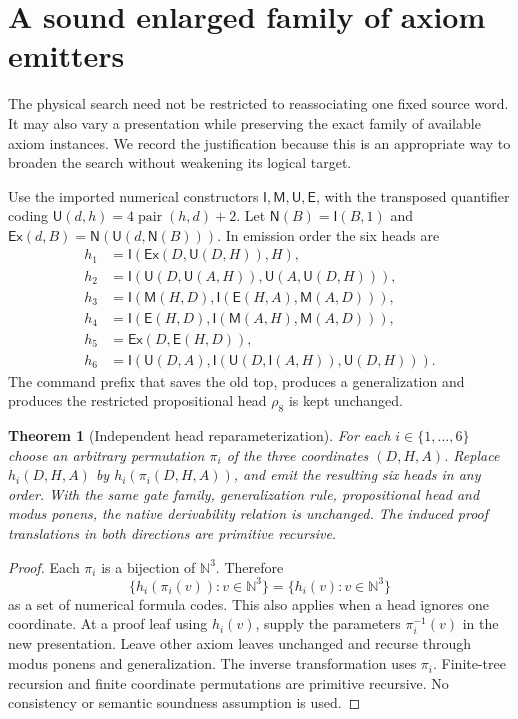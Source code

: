 \documentclass[10pt,letterpaper]{article}
\newtheorem{theorem}{Theorem}
\newcommand{\I}{\mathsf I}
\newcommand{\M}{\mathsf M}
\newcommand{\U}{\mathsf U}
\newcommand{\E}{\mathsf E}
\newcommand{\N}{\mathsf N}
\newcommand{\Ex}{\mathsf{Ex}}
\begin{document}
\section{A sound enlarged family of axiom emitters}

The physical search need not be restricted to reassociating one fixed source
word. It may also vary a presentation while preserving the exact family of
available axiom instances. We record the justification because this is an
appropriate way to broaden the search without weakening its logical target.

Use the imported numerical constructors $\I,\M,\U,\E$, with the transposed
quantifier coding $\U(d,h)=4\operatorname{pair}(h,d)+2$. Let
$\N(B)=\I(B,1)$ and $\Ex(d,B)=\N(\U(d,\N(B)))$. In emission order the six heads are
\begin{align*}
h_1&=\I(\Ex(D,\U(D,H)),H),\\
h_2&=\I(\U(D,\U(A,H)),\U(A,\U(D,H))),\\
h_3&=\I(\M(H,D),\I(\E(H,A),\M(A,D))),\\
h_4&=\I(\E(H,D),\I(\M(A,H),\M(A,D))),\\
h_5&=\Ex(D,\E(H,D)),\\
h_6&=\I(\U(D,A),\I(\U(D,\I(A,H)),\U(D,H))).
\end{align*}
The command prefix that saves the old top, produces a generalization and
produces the restricted propositional head $\rho_8$ is kept unchanged.

\begin{theorem}[Independent head reparameterization]\label{thm:heads}
For each $i\in\{1,\ldots,6\}$ choose an arbitrary permutation $\pi_i$ of the
three coordinates $(D,H,A)$. Replace $h_i(D,H,A)$ by
$h_i(\pi_i(D,H,A))$, and emit the resulting six heads in any order. With the
same gate family, generalization rule, propositional head and modus ponens,
the native derivability relation is unchanged. The induced proof translations
in both directions are primitive recursive.
\end{theorem}
\begin{proof}
Each $\pi_i$ is a bijection of $\mathbb N^3$. Therefore
\[
 \{h_i(\pi_i(v)):v\in\mathbb N^3\}
 =\{h_i(v):v\in\mathbb N^3\}
\]
as a set of numerical formula codes. This also applies when a head ignores
one coordinate. At a proof leaf using $h_i(v)$, supply the parameters
$\pi_i^{-1}(v)$ in the new presentation. Leave other axiom leaves unchanged and
recurse through modus ponens and generalization. The inverse transformation
uses $\pi_i$. Finite-tree recursion and finite coordinate permutations are
primitive recursive. No consistency or semantic soundness assumption is used.
\end{proof}
\end{document}
